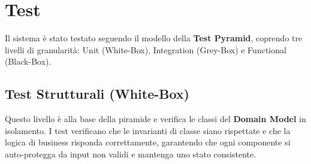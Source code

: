 \section{Test}
Il sistema è stato testato seguendo il modello della \textbf{Test Pyramid}, coprendo tre livelli di granularità: Unit (White-Box), Integration (Grey-Box) e Functional (Black-Box).

\subsection{Test Strutturali (White-Box)}
Questo livello è alla base della piramide e verifica le classi del \textbf{Domain Model} in isolamento. I test verificano che le invarianti di classe siano rispettate e che la logica di business risponda correttamente, garantendo che ogni componente si auto-protegga da input non validi e mantenga uno stato consistente.

